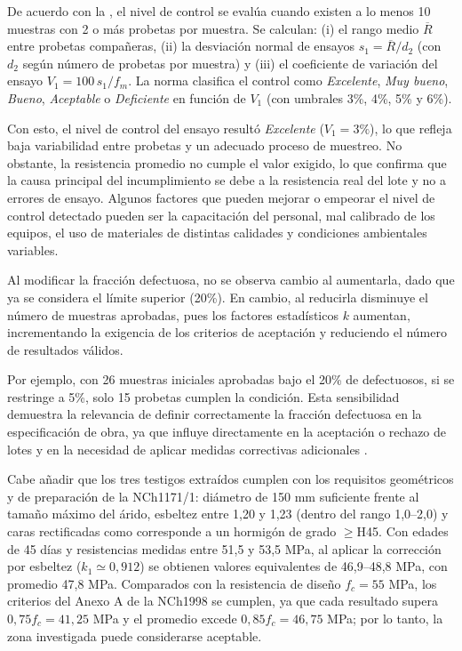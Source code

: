 De acuerdo con la \citep{NCh1998}, el nivel de control se evalúa cuando existen a lo menos 10 muestras con 2 o más probetas por muestra. Se calculan: (i) el rango medio $\overline{R}$ entre probetas compañeras, (ii) la desviación normal de ensayos $s_1=\overline{R}/d_2$ (con $d_2$ según número de probetas por muestra) y (iii) el coeficiente de variación del ensayo $V_1=100\,s_1/f_m$. La norma clasifica el control como \emph{Excelente}, \emph{Muy bueno}, \emph{Bueno}, \emph{Aceptable} o \emph{Deficiente} en función de $V_1$ (con umbrales 3\%, 4\%, 5\% y 6\%).

Con esto, el nivel de control del ensayo resultó \textit{Excelente} ($V_1 = 3\%$), lo que refleja baja variabilidad entre probetas y un adecuado proceso de muestreo. No obstante, la resistencia promedio no cumple el valor exigido, lo que confirma que la causa principal del incumplimiento se debe a la resistencia real del lote y no a errores de ensayo. Algunos factores que pueden mejorar o empeorar el nivel de control detectado pueden ser la capacitación del personal, mal calibrado de los equipos, el uso de materiales de distintas calidades y condiciones ambientales variables.

Al modificar la fracción defectuosa, no se observa cambio al aumentarla, dado que ya se considera el límite superior (20\%). En cambio, al reducirla disminuye el número de muestras aprobadas, pues los factores estadísticos $k$ aumentan, incrementando la exigencia de los criterios de aceptación y reduciendo el número de resultados válidos.

Por ejemplo, con 26 muestras iniciales aprobadas bajo el 20\% de defectuosos, si se restringe a 5\%, solo 15 probetas cumplen la condición. Esta sensibilidad demuestra la relevancia de definir correctamente la fracción defectuosa en la especificación de obra, ya que influye directamente en la aceptación o rechazo de lotes y en la necesidad de aplicar medidas correctivas adicionales \citep{NCh1998}.

Cabe añadir que los tres testigos extraídos cumplen con los requisitos geométricos y de preparación de la NCh1171/1: diámetro de 150 mm suficiente frente al tamaño máximo del árido, esbeltez entre 1,20 y 1,23 (dentro del rango 1,0–2,0) y caras rectificadas como corresponde a un hormigón de grado $\ge$H45. Con edades de 45 días y resistencias medidas entre 51,5 y 53,5 MPa, al aplicar la corrección por esbeltez ($k_1\simeq0,912$) se obtienen valores equivalentes de 46,9–48,8 MPa, con promedio 47,8 MPa. Comparados con la resistencia de diseño $f_c=55$ MPa, los criterios del Anexo A de la NCh1998 se cumplen, ya que cada resultado supera $0,75f_c=41,25$ MPa y el promedio excede $0,85f_c=46,75$ MPa; por lo tanto, la zona investigada puede considerarse aceptable. 







